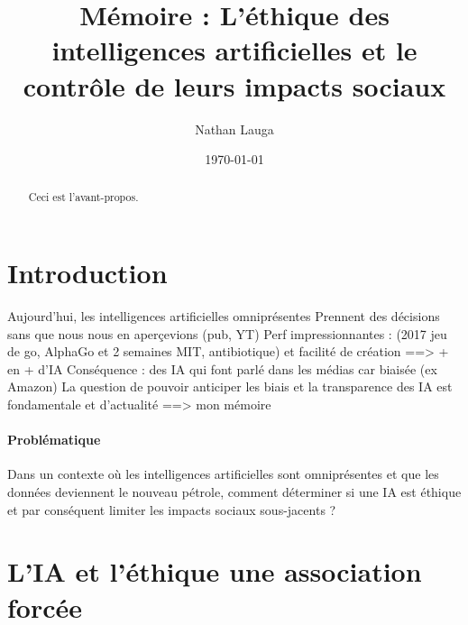\documentclass[10pt, french, a4paper]{article}
\title{Mémoire : L’éthique des intelligences artificielles et le contrôle de leurs impacts sociaux}
\author{Nathan Lauga}
\date{\today}
\begin{document}
\maketitle

\newpage
\tableofcontents

\newpage
\begin{abstract}

    Ceci est l'avant-propos.

\end{abstract}


\newpage
\section{Introduction}


Aujourd'hui, les intelligences artificielles omniprésentes
Prennent des décisions sans que nous nous en aperçevions (pub, YT)
Perf impressionnantes : (2017 jeu de go, AlphaGo et 2 semaines MIT, antibiotique)
et facilité de création ==> + en + d'IA
Conséquence : des IA qui font parlé dans les médias car biaisée (ex Amazon)
La question de pouvoir anticiper les biais et la transparence des IA est fondamentale et d'actualité ==> mon mémoire

\paragraph{Problématique}
Dans un contexte où les intelligences artificielles sont omniprésentes et que les données deviennent le nouveau pétrole, 
comment déterminer si une IA est éthique et par conséquent limiter les impacts sociaux sous-jacents ?



\newpage
\section{L'IA et l'éthique une association forcée}

\end{document}
